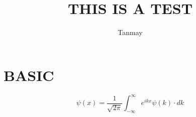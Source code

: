 \documentclass{article}
\begin{document}
\title{THIS IS A TEST}
\author{Tanmay}
\maketitle
\section{BASIC}
\begin{equation}
\psi(x)=\frac{1}{\sqrt{2\pi}} \int_{-\infty}^{\infty}{ e^{ikx} \psi(k)\cdot dk}
\end{equation}
\end{document}
